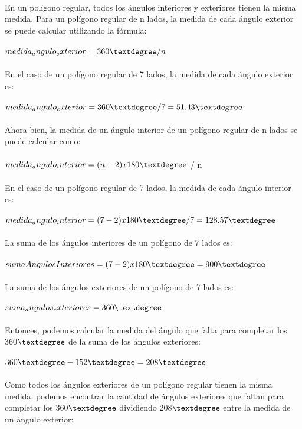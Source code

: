 \documentclass{article}
\begin{document}
\\
En un polígono regular, todos los ángulos interiores y exteriores tienen la misma medida. Para un polígono regular de n lados, la medida de cada ángulo exterior se puede calcular utilizando la fórmula:\\
\\
$medida_angulo_exterior = 360\textdegree / n$\\
\\
En el caso de un polígono regular de 7 lados, la medida de cada ángulo exterior es:\\
\\
$medida_angulo_exterior = 360\textdegree / 7 = 51.43\textdegree$\\
\\
Ahora bien, la medida de un ángulo interior de un polígono regular de n lados se puede calcular como:\\
\\
$medida_angulo_interior = (n - 2) x 180\textdegree$ / n\\
\\
En el caso de un polígono regular de 7 lados, la medida de cada ángulo interior es:\\
\\
$medida_angulo_interior = (7 - 2) x 180\textdegree / 7 = 128.57\textdegree$\\
\\
La suma de los ángulos interiores de un polígono de 7 lados es:\\
\\
$sumaAngulosInteriores = (7 - 2) x 180\textdegree = 900\textdegree$\\
\\
La suma de los ángulos exteriores de un polígono de 7 lados es:\\
\\
$suma_angulos_exteriores = 360\textdegree$\\
\\
Entonces, podemos calcular la medida del ángulo que falta para completar los 360$\textdegree$ de la suma de los ángulos exteriores:\\
\\
$360\textdegree - 152\textdegree = 208\textdegree$\\
\\
Como todos los ángulos exteriores de un polígono regular tienen la misma medida, podemos encontrar la cantidad de ángulos exteriores que faltan para completar los 360$\textdegree$ dividiendo 208$\textdegree$ entre la medida de un ángulo exterior:\\
\end{document}
